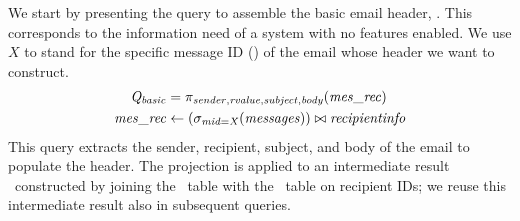 We start by presenting the query to assemble the basic email header, \Qbasic.
This corresponds to the information need of a system with no features enabled.
We use $X$ to stand for the specific message ID (\midatt) of the email whose
header we want to construct.
%
\begin{align*}
\Qbasic &= 
\projectRel{\sender,\rvalue,\subject,\body} {(\mrtable)} \\
\mrtable &\leftarrow (\selectRel\midCond {(\messages)}) \bowtie \recipientinfo
\end{align*}
%
\noindent
This query extracts the sender, recipient, subject, and body of the email to
populate the header. The projection is applied to an intermediate result
\mrtable\ constructed by joining the \messages\ table with the \recipientinfo\
table on recipient IDs; we reuse this intermediate result also in subsequent
queries.


